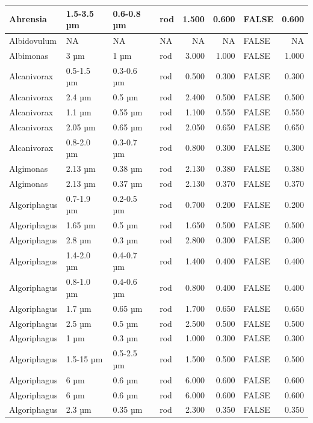 \documentclass[
]{article}
\begin{document}
\begin{table}
\begin{tabular}{l|l|l|l|r|r|l|r}
\hline
Ahrensia & 1.5-3.5 µm & 0.6-0.8 µm & rod & 1.500 & 0.600 & FALSE & 0.600\\
\hline
Albidovulum & NA & NA & NA & NA & NA & FALSE & NA\\
\hline
Albimonas & 3 µm & 1 µm & rod & 3.000 & 1.000 & FALSE & 1.000\\
\hline
Alcanivorax & 0.5-1.5 µm & 0.3-0.6 µm & rod & 0.500 & 0.300 & FALSE & 0.300\\
\hline
Alcanivorax & 2.4 µm & 0.5 µm & rod & 2.400 & 0.500 & FALSE & 0.500\\
\hline
Alcanivorax & 1.1 µm & 0.55 µm & rod & 1.100 & 0.550 & FALSE & 0.550\\
\hline
Alcanivorax & 2.05 µm & 0.65 µm & rod & 2.050 & 0.650 & FALSE & 0.650\\
\hline
Alcanivorax & 0.8-2.0 µm & 0.3-0.7 µm & rod & 0.800 & 0.300 & FALSE & 0.300\\
\hline
Algimonas & 2.13 µm & 0.38 µm & rod & 2.130 & 0.380 & FALSE & 0.380\\
\hline
Algimonas & 2.13 µm & 0.37 µm & rod & 2.130 & 0.370 & FALSE & 0.370\\
\hline
Algoriphagus & 0.7-1.9 µm & 0.2-0.5 µm & rod & 0.700 & 0.200 & FALSE & 0.200\\
\hline
Algoriphagus & 1.65 µm & 0.5 µm & rod & 1.650 & 0.500 & FALSE & 0.500\\
\hline
Algoriphagus & 2.8 µm & 0.3 µm & rod & 2.800 & 0.300 & FALSE & 0.300\\
\hline
Algoriphagus & 1.4-2.0 µm & 0.4-0.7 µm & rod & 1.400 & 0.400 & FALSE & 0.400\\
\hline
Algoriphagus & 0.8-1.0 µm & 0.4-0.6 µm & rod & 0.800 & 0.400 & FALSE & 0.400\\
\hline
Algoriphagus & 1.7 µm & 0.65 µm & rod & 1.700 & 0.650 & FALSE & 0.650\\
\hline
Algoriphagus & 2.5 µm & 0.5 µm & rod & 2.500 & 0.500 & FALSE & 0.500\\
\hline
Algoriphagus & 1 µm & 0.3 µm & rod & 1.000 & 0.300 & FALSE & 0.300\\
\hline
Algoriphagus & 1.5-15 µm & 0.5-2.5 µm & rod & 1.500 & 0.500 & FALSE & 0.500\\
\hline
Algoriphagus & 6 µm & 0.6 µm & rod & 6.000 & 0.600 & FALSE & 0.600\\
\hline
Algoriphagus & 6 µm & 0.6 µm & rod & 6.000 & 0.600 & FALSE & 0.600\\
\hline
Algoriphagus & 2.3 µm & 0.35 µm & rod & 2.300 & 0.350 & FALSE & 0.350\\

\end{tabular}
\end{table}
\end{document}
